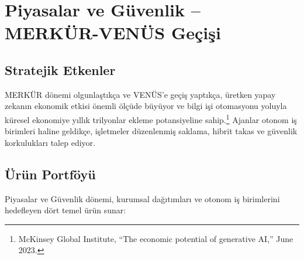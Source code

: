 \documentclass[11pt]{article}
\begin{document}
\section{Piyasalar ve Güvenlik -- MERKÜR-VENÜS Geçişi}
\subsection{Stratejik Etkenler}
MERKÜR dönemi olgunlaştıkça ve VENÜS'e geçiş yaptıkça, üretken yapay zekanın ekonomik etkisi önemli ölçüde büyüyor ve bilgi işi otomasyonu yoluyla küresel ekonomiye yıllık trilyonlar ekleme potansiyeline sahip.\footnote{McKinsey Global Institute, ``The economic potential of generative AI,'' June 2023.} Ajanlar otonom iş birimleri haline geldikçe, işletmeler düzenlenmiş saklama, hibrit takas ve güvenlik korkulukları talep ediyor.

\subsection{Ürün Portföyü}
Piyasalar ve Güvenlik dönemi, kurumsal dağıtımları ve otonom iş birimlerini hedefleyen dört temel ürün sunar:
\end{document}
